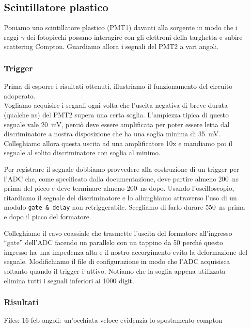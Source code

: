 
\subsection{Scintillatore plastico}

Poniamo uno scintillatore plastico (PMT1) davanti alla sorgente in modo che i raggi $\gamma$ dei fotopicchi possano interagire con gli elettroni della targhetta e subire scattering Compton. Guardiamo allora i segnali del PMT2 a vari angoli.


\subsubsection{Trigger}

Prima di esporre i risultati ottenuti, illustriamo il funzionamento del circuito adoperato.\\
Vogliamo acquisire i segnali ogni volta che l'uscita negativa di breve durata (qualche \si{ns}) del PMT2 supera una certa soglia. L'ampiezza tipica di questo segnale vale \SI{20}{mV}, perciò deve essere amplificata per poter essere letta dal discriminatore a nostra disposizione che ha una soglia minima di \SI{35}{mV}. Colleghiamo allora questa uscita ad una amplificatore 10x 
e mandiamo poi il segnale al solito discriminatore con soglia al minimo.

Per registrare il segnale dobbiamo provvedere alla costruzione di un trigger per l'ADC che, come specificato dalla documentazione, deve partire almeno \SI{200}{ns} prima del picco e deve terminare almeno \SI{200}{ns} dopo. Usando l'oscilloscopio, ritardiamo il segnale del discriminatore e lo allunghiamo attraverso l'uso di un modulo \texttt{gate \& delay} non retriggerabile. Scegliamo di farlo durare \SI{550}{ns} prima e dopo il picco del formatore.

Colleghiamo il cavo coassiale che trasmette l'uscita del formatore all'ingresso ``gate'' dell'ADC facendo un parallelo con un tappino da \SI{50}{\Omega} perché questo ingresso ha una impedenza alta e il nostro accorgimento evita la deformazione del segnale.
Modifichiamo il file di configurazione in modo che l'ADC acquisisca soltanto quando il trigger è attivo. Notiamo che la soglia appena utilizzata elimina tutti i segnali inferiori ai 1000 digit. 

\subsubsection{Risultati} %
Files: 16-feb angoli: un'occhiata veloce evidenzia lo spostamento compton
